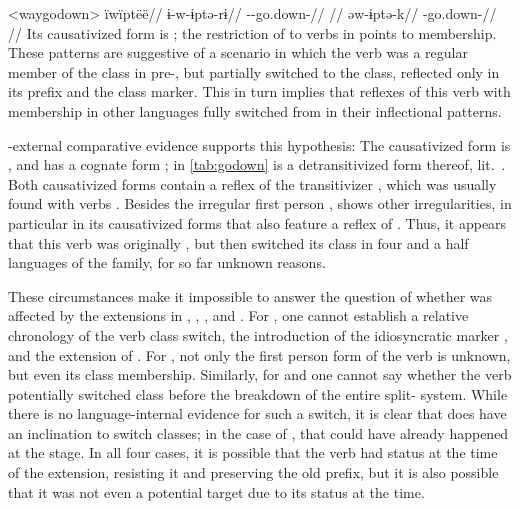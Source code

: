 \pex<waygodown>\wayana \parencite[][200]{wayanatavares2005}
\begingl
\glpreamble ïwïptëë//
\gla ɨ-w-ɨptə-rɨ//
\glb {}--go.down-//
\glft {}//
\endgl
{}
\begingl
\gla əw-ɨptə-k//
\glb {}-go.down-//
\glft {}//
\endgl
\xe
%
Its causativized form is  \parencite[255]{wayanatavares2005}; the restriction of  to  verbs in \PC \parencite{gildea2019overview} points to  membership.
These patterns are suggestive of a scenario in which the verb was a regular member of the  class in pre-\wayana, but partially switched to the  class, reflected only in its  prefix and the  class marker.
This in turn implies that reflexes of this verb with  membership in other languages fully switched from  in their inflectional patterns.

\wayana-external comparative evidence supports this hypothesis:
The \arara causativized form is  \parencite[66]{alves2017arara}, and \kalina has a cognate form  \parencite[263]{courtz2008carib};   in \cref{tab:godown} is a detransitivized form thereof, lit.\ .
Both causativized forms contain a reflex of the transitivizer , which was usually found with  verbs \parencite{gildea2019overview}.
Besides the irregular first person , \trio {} shows other irregularities, in particular in its causativized forms that also feature a reflex of  \parencite[263]{triomeira1999}.
Thus, it appears that this verb was originally , but then switched its class in four and a half languages of the family, for so far unknown reasons.

These circumstances make it impossible to answer the question of whether  was affected by the extensions in \PWai, \PTir, \carijo, and \yukpa.
For \PTir, one cannot establish a relative chronology of the verb class switch, the introduction of the idiosyncratic marker , and the extension of .
For \PWai, not only the first person form of the verb is unknown, but even its class membership.
Similarly, for \carijo and \yukpa one cannot say whether the verb potentially switched class before the breakdown of the entire split- system.
While there is no language-internal evidence for such a switch, it is clear that  does have an inclination to switch classes; in the case of \carijo, that could have already happened at the \PTar stage.
In all four cases, it is possible that the verb had  status at the time of the extension, resisting it and preserving the old prefix, but it is also possible that it was not even a potential target due to its  status at the time.

